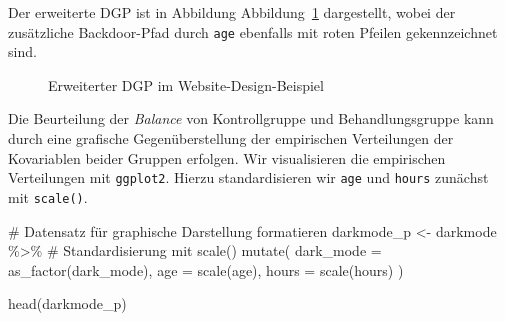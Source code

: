 \documentclass[
  a4paper,
  DIV=11,
  oneside]{scrreprt}
\newenvironment{Shaded}{\begin{snugshade}}{\end{snugshade}}
\newcommand{\AttributeTok}[1]{\textcolor[rgb]{0.40,0.45,0.13}{#1}}
\newcommand{\CommentTok}[1]{\textcolor[rgb]{0.37,0.37,0.37}{#1}}
\newcommand{\FunctionTok}[1]{\textcolor[rgb]{0.28,0.35,0.67}{#1}}
\newcommand{\NormalTok}[1]{\textcolor[rgb]{0.00,0.23,0.31}{#1}}
\newcommand{\OtherTok}[1]{\textcolor[rgb]{0.00,0.23,0.31}{#1}}
\newcommand{\SpecialCharTok}[1]{\textcolor[rgb]{0.37,0.37,0.37}{#1}}
\begin{document}
Der erweiterte DGP ist in Abbildung Abbildung~\ref{fig-CDdarkmode}
dargestellt, wobei der zusätzliche Backdoor-Pfad durch \texttt{age}
ebenfalls mit roten Pfeilen gekennzeichnet sind.

\begin{figure}[t]


\caption{\label{fig-CDdarkmode}Erweiterter DGP im
Website-Design-Beispiel}

\end{figure}%

Die Beurteilung der \emph{Balance} von Kontrollgruppe und
Behandlungsgruppe kann durch eine grafische Gegenüberstellung der
empirischen Verteilungen der Kovariablen beider Gruppen erfolgen. Wir
visualisieren die empirischen Verteilungen mit \texttt{ggplot2}. Hierzu
standardisieren wir \texttt{age} und \texttt{hours} zunächst mit
\texttt{scale()}.

\begin{Shaded}
\begin{Highlighting}[]
\CommentTok{\# Datensatz für graphische Darstellung formatieren}
\NormalTok{darkmode\_p }\OtherTok{\textless{}{-}}\NormalTok{ darkmode }\SpecialCharTok{\%\textgreater{}\%} 
  \CommentTok{\# Standardisierung mit \textquotesingle{}scale()\textquotesingle{}}
  \FunctionTok{mutate}\NormalTok{(}
    \AttributeTok{dark\_mode =} \FunctionTok{as\_factor}\NormalTok{(dark\_mode),}
    \AttributeTok{age =} \FunctionTok{scale}\NormalTok{(age), }
    \AttributeTok{hours =} \FunctionTok{scale}\NormalTok{(hours)}
\NormalTok{  )}

\FunctionTok{head}\NormalTok{(darkmode\_p)}
\end{Highlighting}
\end{Shaded}
\end{document}
